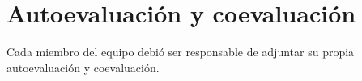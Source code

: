 \documentclass{article}
\begin{document}
\section{Autoevaluación y coevaluación}
Cada miembro del equipo debió ser responsable de adjuntar su propia autoevaluación
y coevaluación.


%
%
\end{document}
